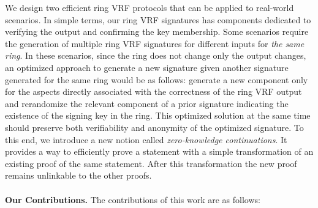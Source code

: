 We design two efficient ring VRF protocols that can be applied to real-world scenarios.
In simple terms,  our ring VRF signatures has components dedicated to verifying the output and confirming the key membership. Some scenarios require the generation of multiple ring VRF signatures for different inputs for \emph{the same ring}. In these scenarios, since the ring does not change only the output changes, an optimized approach to generate a new signature given another signature generated for the same ring would be as follows:  generate a new component only for the aspects directly associated with the correctness of the ring VRF output and  rerandomize the relevant component of a prior signature indicating the existence of the signing key in the ring. This optimized solution at the same time should preserve both verifiability and anonymity of the optimized signature.
To this end, we introduce a  new notion called \emph{zero-knowledge continuations}. It provides a way to efficiently prove a statement with a simple transformation of an existing proof of the same statement. After this transformation the new proof remains unlinkable to the other proofs. 
\\\\
\noindent \textbf{Our Contributions.} The contributions of this work are as follows:

